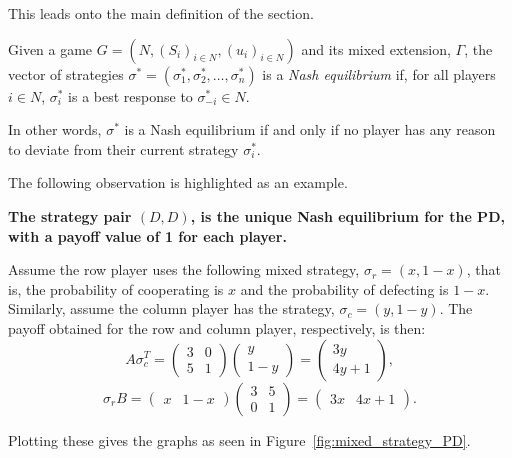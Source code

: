 This leads onto the main definition of the section.
\begin{definition}\label{def:NE}
    Given a game \(G=(N, {(S_{i})}_{i \in N}, {(u_{i})}_{i \in N})\) and its
    mixed extension, \(\Gamma \), the vector of
    strategies \(\sigma^{*} = (\sigma_{1}^{*}, \sigma_{2}^{*}, \ldots, \sigma_{n}^{*})\) is a
    \textit{Nash equilibrium} if, for all players \(i \in N\), \(\sigma_{i}^{*}\) is 
    a best response to \(\sigma_{-i}^{*} \in N\).
\end{definition}

In other words, \(\sigma^{*}\) is a Nash equilibrium if and only if no player has any
reason to deviate from their current strategy \(\sigma_{i}^{*}\).

The following observation is highlighted as an example.

\begin{center}
    \textbf{The strategy pair \((D, D)\), is the unique Nash equilibrium 
    for the PD, with a payoff value of 1 for each player.}
\end{center}

Assume the row player uses the following mixed strategy, \(\sigma_{r} = (x,
1-x)\), that is, the probability of cooperating is \(x\) and the probability of
defecting is \(1-x\). Similarly, assume the column player has 
the strategy, \(\sigma_{c} = (y, 1-y)\). The payoff obtained for the row and column player, respectively, is then:
\[
    A\sigma_{c}^T = \begin{pmatrix}
        3 & 0 \\
        5 & 1
    \end{pmatrix} \begin{pmatrix}
        y \\
        1-y
    \end{pmatrix} = \begin{pmatrix}
        3y \\
        4y + 1
    \end{pmatrix},
\]
\[
    \sigma_{r}B = \begin{pmatrix}
        x & 1-x
    \end{pmatrix} \begin{pmatrix}
        3 & 5 \\
        0 & 1        
    \end{pmatrix}  = \begin{pmatrix}
        3x & 4x + 1
    \end{pmatrix}.
\]

Plotting these gives the graphs as seen in Figure~\ref{fig:mixed_strategy_PD}.

